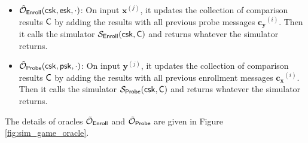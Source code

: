 \begin{itemize}

	\item $\tilde{\mathcal{O}}_{\sf Enroll} ({\sf csk} ,{\sf esk}, \cdot)$: On input $\mathbf{x}^{(j)}$, it updates the collection of comparison results ${\sf C}$ by adding the results with all previous probe messages $\mathbf{c_y}^{(i)}$. Then it calls the simulator $\mathcal{S}_{\sf Enroll}({\sf csk}, {\sf C})$ and returns whatever the simulator returns.

	\item $\tilde{\mathcal{O}}_{\sf Probe} ({\sf csk}, {\sf psk}, \cdot)$: On input $\mathbf{y}^{(j)}$, it updates the collection of comparison results ${\sf C}$ by adding the results with all previous enrollment messages $\mathbf{c_x}^{(i)}$. Then it calls the simulator $\mathcal{S}_{\sf Probe}({\sf csk}, {\sf C})$ and returns whatever the simulator returns.

\end{itemize}

The details of oracles $\tilde{\mathcal{O}}_{\sf Enroll}$ and $\tilde{\mathcal{O}}_{\sf Probe}$ are given in Figure \ref{fig:sim_game_oracle}.

